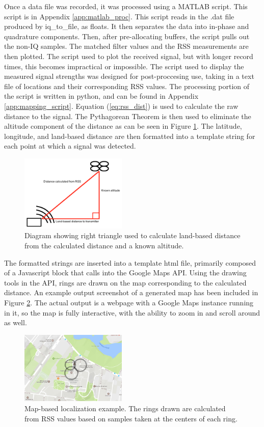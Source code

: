 \documentclass[journal,transmag]{IEEEtran}
\begin{document}
Once a data file was recorded, it was processed using a MATLAB script. This script 
is in Appendix \ref{app:matlab_proc}. This script reads in the .dat file produced 
by iq\_to\_file, as floats. It then separates the data into in-phase and quadrature
components. Then, after pre-allocating buffers, the script pulls out the non-IQ 
samples. The matched filter values and the RSS measurements are then plotted. The
script used to plot the received signal, but with longer record times, this
becomes impractical or impossible.
The script used to display the measured signal strengths was designed for post-proccesing use, taking in a text file of locations and their corresponding RSS values. The processing portion of the script is written in python, and can be found in Appendix \ref{app:mapping_script}. Equation (\ref{eq:rss_dist}) is used to calculate the raw distance to the signal. The Pythagorean Theorem is then used to eliminate the altitude component of the distance as can be seen in Figure \ref{fig:dist_pyth}. The latitude, longitude, and land-based distance are then formatted into a template string for each point at which a signal was detected.\par
\begin{figure}[h!]
\centering
\includegraphics[width=0.45\textwidth]{img/distance_pythag_diagram.png}
\caption{Diagram showing right triangle used to calculate land-based distance from the calculated distance and a known altitude.}
\label{fig:dist_pyth}
\end{figure}
The formatted strings are inserted into a template html file, primarily composed of a Javascript block that calls into the Google Maps API. Using the drawing tools in the API, rings are drawn on the map corresponding to the calculated distance. An example output screenshot of a generated map has been included in Figure \ref{fig:map_localize}. The actual output is a webpage with a Google Maps instance running in it, so the map is fully interactive, with the ability to zoom in and scroll around as well.\par
\begin{figure}[h!]
\centering
\includegraphics[width=0.45\textwidth]{img/localization_map_visualization.png}
\caption{Map-based localization example. The rings drawn are calculated from RSS values based on samples taken at the centers of each ring.}
\label{fig:map_localize}
\end{figure}
\end{document}
